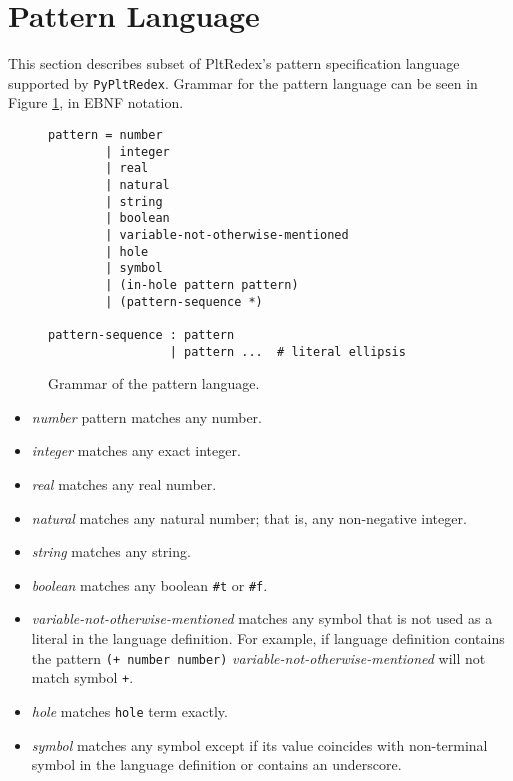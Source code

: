 \section{Pattern Language}

This section describes subset of PltRedex's pattern specification language supported by \texttt{PyPltRedex}. Grammar for the pattern language can be seen in Figure \ref{pattern-grammar}, in EBNF notation. 

\begin{figure}[h]
\begin{verbatim}
pattern = number 
        | integer 
        | real 
        | natural 
        | string 
        | boolean 
        | variable-not-otherwise-mentioned 
        | hole 
        | symbol
        | (in-hole pattern pattern)
        | (pattern-sequence *) 

pattern-sequence : pattern 
                 | pattern ...  # literal ellipsis
\end{verbatim}
\caption{Grammar of the pattern language.}
\label{pattern-grammar}
\end{figure}

\begin{itemize}
\item
\textit{number} pattern matches any number.

\item
\textit{integer} matches any exact integer. 

\item
\textit{real} matches any real number.

\item
\textit{natural} matches any natural number; that is, any non-negative integer.

\item
\textit{string} matches any string.

\item
\textit{boolean} matches any boolean \texttt{\#t} or \texttt{\#f}.
\item
\textit{variable-not-otherwise-mentioned} matches any symbol that is not used as a literal in the language definition. For example, if language definition contains the pattern \texttt{(+ number number)} \textit{variable-not-otherwise-mentioned} will not match symbol \texttt{+}.

\item
\textit{hole} matches \texttt{hole} term exactly.

\item
\textit{symbol} matches any symbol except if its value coincides with non-terminal symbol in the language definition or contains an underscore.
\end{itemize}

